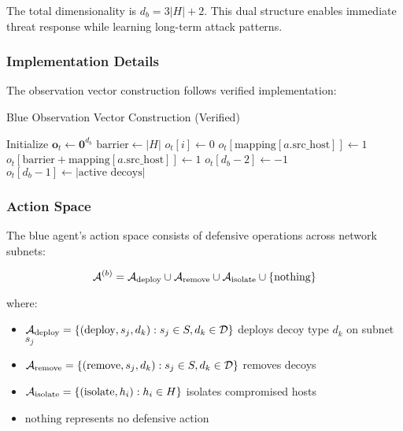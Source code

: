 \documentclass[11pt]{article}
\theoremstyle{definition}
\theoremstyle{plain}
\begin{document}
The total dimensionality is $d_b = 3|H| + 2$. This dual structure enables immediate threat response while learning long-term attack patterns.

\subsubsection{Implementation Details}
The observation vector construction follows verified implementation:

\begin{algorithm}
\caption{Blue Observation Vector Construction (Verified)}
\begin{algorithmic}[1]
\STATE Initialize $\mathbf{o}_t \leftarrow \mathbf{0}^{d_b}$
\STATE $\text{barrier} \leftarrow |H|$
    \STATE $o_t[i] \leftarrow 0$ 
\ENDFOR
{}
        \STATE $o_t[\text{mapping}[a.\text{src\_host}]] \leftarrow 1$
        \STATE $o_t[\text{barrier} + \text{mapping}[a.\text{src\_host}]] \leftarrow 1$ 
    \ENDIF
\ENDFOR
\STATE $o_t[d_b-2] \leftarrow -1$ 
\STATE $o_t[d_b-1] \leftarrow |\text{active decoys}|$ 
\end{algorithmic}
\end{algorithm}

\subsubsection{Action Space}
The blue agent's action space consists of defensive operations across network subnets:

\begin{equation}
\mathcal{A}^{(b)} = \mathcal{A}_{\text{deploy}} \cup \mathcal{A}_{\text{remove}} \cup \mathcal{A}_{\text{isolate}} \cup \{\text{nothing}\}
\end{equation}

where:
\begin{itemize}
    \item $\mathcal{A}_{\text{deploy}} = \{(\text{deploy}, s_j, d_k) : s_j \in S, d_k \in \mathcal{D}\}$ deploys decoy type $d_k$ on subnet $s_j$
    \item $\mathcal{A}_{\text{remove}} = \{(\text{remove}, s_j, d_k) : s_j \in S, d_k \in \mathcal{D}\}$ removes decoys
    \item $\mathcal{A}_{\text{isolate}} = \{(\text{isolate}, h_i) : h_i \in H\}$ isolates compromised hosts
    \item $\text{nothing}$ represents no defensive action
\end{itemize}
\end{document}
